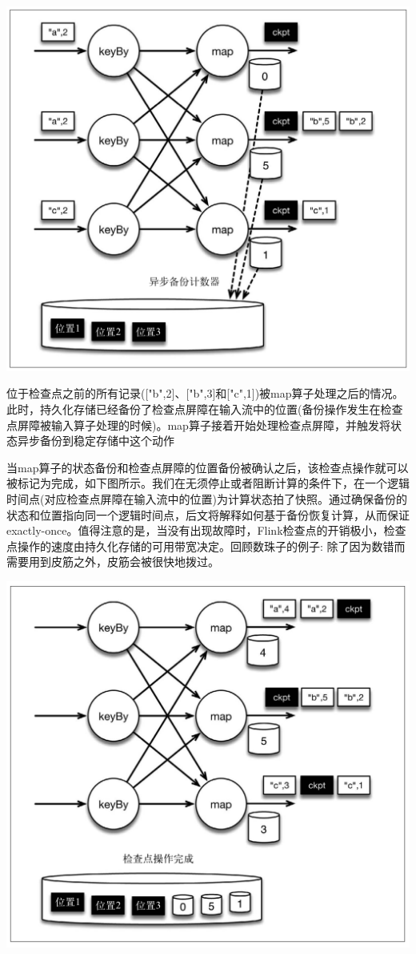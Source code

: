\documentclass[oneside]{ctexbook}
\begin{document}
\noindent \includegraphics[width=\textwidth]{ckpt3.png}

位于检查点之前的所有记录(["b",2]、["b",3]和["c",1])被map算子处理之后的情况。此时，持久化存储已经备份了检查点屏障在输入流中的位置(备份操作发生在检查点屏障被输入算子处理的时候)。map算子接着开始处理检查点屏障，并触发将状态异步备份到稳定存储中这个动作

当map算子的状态备份和检查点屏障的位置备份被确认之后，该检查点操作就可以被标记为完成，如下图所示。我们在无须停止或者阻断计算的条件下，在一个逻辑时间点(对应检查点屏障在输入流中的位置)为计算状态拍了快照。通过确保备份的状态和位置指向同一个逻辑时间点，后文将解释如何基于备份恢复计算，从而保证exactly-once。值得注意的是，当没有出现故障时，Flink检查点的开销极小，检查点操作的速度由持久化存储的可用带宽决定。回顾数珠子的例子: 除了因为数错而需要用到皮筋之外，皮筋会被很快地拨过。

\noindent \includegraphics[width=\textwidth]{ckpt4.png}
\end{document}

